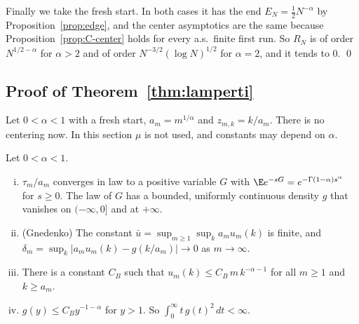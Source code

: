Finally we take the fresh start. In both cases it has the end $E_N=\frac12N^{-\alpha}$
by Proposition~\ref{prop:edge}, and the center asymptotics are the same because
Proposition~\ref{prop:C-center} holds for every a.s.\ finite first run. So $R_N$ is of
order $N^{1/2-\alpha}$ for $\alpha>2$ and of order $N^{-3/2}(\log N)^{1/2}$ for
$\alpha=2$, and it tends to $0$.
\qed

\subsection{Proof of Theorem~\ref{thm:lamperti}}\label{app:heavy-lamperti}

Let $0<\alpha<1$ with a fresh start, $a_m=m^{1/\alpha}$ and $z_{m,k}=k/a_m$. There is no
centering now. In this section $\mu$ is not used, and constants may depend on $\alpha$.

\begin{lemma}\label{lem:C-stable1}
Let $0<\alpha<1$.
\begin{enumerate}[(i)]
\item $\tau_m/a_m$ converges in law to a positive variable $G$ with
$\E e^{-sG}=e^{-\Gamma(1-\alpha)s^\alpha}$ for $s\ge0$. The law of $G$ has a bounded,
uniformly continuous density $g$ that vanishes on $(-\infty,0]$ and at $+\infty$.
\item (Gnedenko) The constant $\bar u=\sup_{m\ge1}\sup_ka_mu_m(k)$ is finite, and
$\delta_m=\sup_k\lvert a_mu_m(k)-g(k/a_m)\rvert\to0$ as $m\to\infty$.
\item There is a constant $C_B$ such that $u_m(k)\le C_B\,m\,k^{-\alpha-1}$ for all
$m\ge1$ and $k\ge a_m$.
\item $g(y)\le C_By^{-1-\alpha}$ for $y>1$. So $\int_0^\infty t\,g(t)^2\,dt<\infty$.
\end{enumerate}
\end{lemma}

